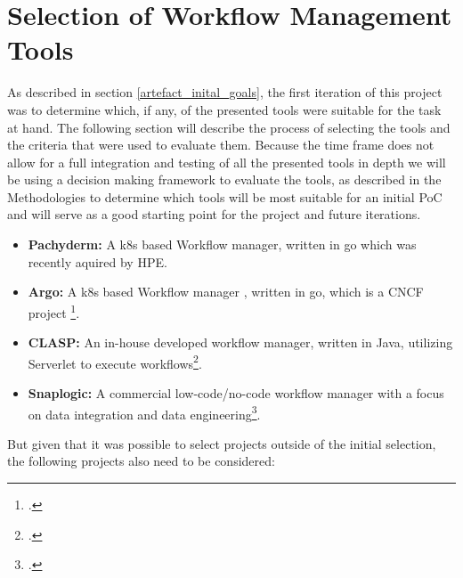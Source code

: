 \section{Selection of Workflow Management Tools}

As described in section \ref{artefact_inital_goals}, the first iteration of this project was to determine which, if any, of the presented tools were suitable for the task at hand.
The following section will describe the process of selecting the tools and the criteria that were used to evaluate them.
Because the time frame does not allow for a full integration and testing of all the presented tools in depth we will be using a decision making framework to evaluate the tools,
as described in the Methodologies  to determine which tools will be most suitable for an initial \ac{PoC} and will serve as a good starting point for the project and future iterations.

\begin{itemize}
    \item \textbf{Pachyderm:} A \ac{k8s} based Workflow manager, written in go which was recently aquired by \ac{HPE}.
    \item \textbf{Argo:} A \ac{k8s} based Workflow manager , written in go, which is a \ac{CNCF} project \footcite{ArgoprojArgoworkflows2023}.
    \item \textbf{\ac{CLASP}:}  An in-house developed workflow manager, written in Java, utilizing Serverlet to execute workflows\footcite{sayersCloudApplicationServices2015}.
    \item \textbf{Snaplogic:} A commercial low-code/no-code workflow manager with a focus on data integration and data engineering\footcite{IPaaSSolutionEnterprise}.
\end{itemize}

But given that it was possible to select projects outside of the initial selection, the following projects also need to be considered:


